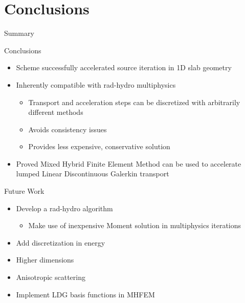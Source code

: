 \documentclass[10pt]{beamer}
\begin{document}
\section{Conclusions}

\begin{frame}{Summary}

    \onslide<+->
    Conclusions
    \begin{itemize} \vspace{-.1in}
        \item Scheme successfully accelerated source iteration in 1D slab geometry 

        \item Inherently compatible with rad-hydro multiphysics 

        \begin{itemize}
            \item Transport and acceleration steps can be discretized with arbitrarily different methods 
            \item Avoids consistency issues 
            \item Provides less expensive, conservative solution 
        \end{itemize}

        \item Proved Mixed Hybrid Finite Element Method can be used to accelerate lumped Linear Discontinuous Galerkin transport 

    \end{itemize}

    \onslide<+->
    Future Work 
    \begin{itemize} \vspace{-.1in}
        \item Develop a rad-hydro algorithm 

        \begin{itemize}
            \item Make use of inexpensive Moment solution in multiphysics iterations 
        \end{itemize}

        \item Add discretization in energy 

        \item Higher dimensions 

        \item Anisotropic scattering 

        \item Implement LDG basis functions in MHFEM 

    \end{itemize}

\end{frame}
\end{document}
